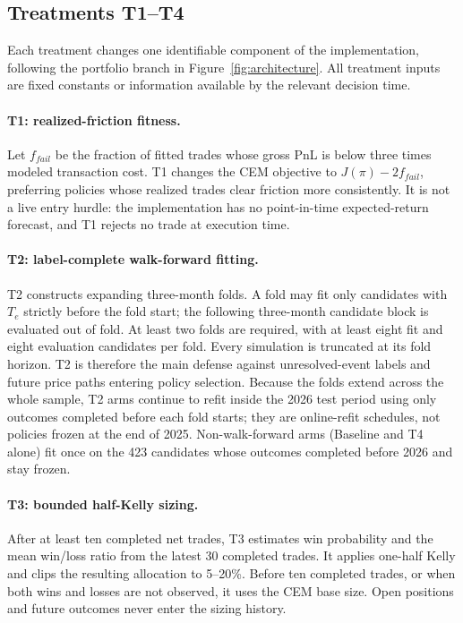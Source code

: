 \documentclass[sigconf,anonymous]{acmart}
\begin{document}
\subsection{Treatments T1--T4}

Each treatment changes one identifiable component of the implementation, following the portfolio branch in Figure~\ref{fig:architecture}. All treatment inputs are fixed constants or information available by the relevant decision time.

\paragraph{T1: realized-friction fitness.}
Let $f_{fail}$ be the fraction of fitted trades whose gross PnL is below three times modeled transaction cost. T1 changes the CEM objective to $J(\pi)-2f_{fail}$, preferring policies whose realized trades clear friction more consistently. It is not a live entry hurdle: the implementation has no point-in-time expected-return forecast, and T1 rejects no trade at execution time.

\paragraph{T2: label-complete walk-forward fitting.}
T2 constructs expanding three-month folds. A fold may fit only candidates with $T_e$ strictly before the fold start; the following three-month candidate block is evaluated out of fold. At least two folds are required, with at least eight fit and eight evaluation candidates per fold. Every simulation is truncated at its fold horizon. T2 is therefore the main defense against unresolved-event labels and future price paths entering policy selection. Because the folds extend across the whole sample, T2 arms continue to refit inside the 2026 test period using only outcomes completed before each fold starts; they are online-refit schedules, not policies frozen at the end of 2025. Non-walk-forward arms (Baseline and T4 alone) fit once on the 423 candidates whose outcomes completed before 2026 and stay frozen.

\paragraph{T3: bounded half-Kelly sizing.}
After at least ten completed net trades, T3 estimates win probability and the mean win/loss ratio from the latest 30 completed trades. It applies one-half Kelly and clips the resulting allocation to 5--20\%. Before ten completed trades, or when both wins and losses are not observed, it uses the CEM base size. Open positions and future outcomes never enter the sizing history.
\end{document}
